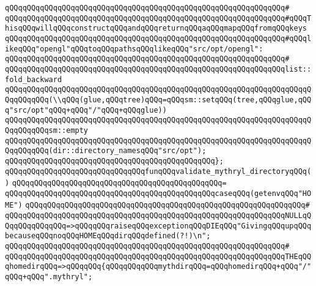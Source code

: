 \verb|qQQqqQQqqQQqqQQqqQQqqQQqqQQqqQQqqQQqqQQqqQQqqQQqqQQqqQQqqQQqqQQq#|\newline
\newline
\verb|qQQqqQQqqQQqqQQqqQQqqQQqqQQqqQQqqQQqqQQqqQQqqQQqqQQqqQQqqQQqqQQq#qQQqThisqQQqwillqQQqconstructqQQqandqQQqreturnqQQqaqQQqmapqQQqfromqQQqkeys|\newline
\verb|qQQqqQQqqQQqqQQqqQQqqQQqqQQqqQQqqQQqqQQqqQQqqQQqqQQqqQQqqQQqqQQq#qQQqlikeqQQq"opengl"qQQqtoqQQqpathsqQQqlikeqQQq"src/opt/opengl":|\newline
\verb|qQQqqQQqqQQqqQQqqQQqqQQqqQQqqQQqqQQqqQQqqQQqqQQqqQQqqQQqqQQqqQQq#|\newline
\verb|qQQqqQQqqQQqqQQqqQQqqQQqqQQqqQQqqQQqqQQqqQQqqQQqqQQqqQQqqQQqqQQqlist::fold_backward|\newline
\verb|qQQqqQQqqQQqqQQqqQQqqQQqqQQqqQQqqQQqqQQqqQQqqQQqqQQqqQQqqQQqqQQqqQQqqQQqqQQqqQQq(\\qQQq(glue,qQQqtree)qQQq=qQQqsm::setqQQq(tree,qQQqglue,qQQq"src/opt"qQQq+qQQq"/"qQQq+qQQqglue))|\newline
\verb|qQQqqQQqqQQqqQQqqQQqqQQqqQQqqQQqqQQqqQQqqQQqqQQqqQQqqQQqqQQqqQQqqQQqqQQqqQQqqQQqsm::empty|\newline
\verb|qQQqqQQqqQQqqQQqqQQqqQQqqQQqqQQqqQQqqQQqqQQqqQQqqQQqqQQqqQQqqQQqqQQqqQQqqQQqqQQq(dir::directory_namesqQQq"src/opt");|\newline
\verb|qQQqqQQqqQQqqQQqqQQqqQQqqQQqqQQqqQQqqQQqqQQqqQQq};|\newline
\newline
\verb|qQQqqQQqqQQqqQQqqQQqqQQqqQQqqQQqfunqQQqvalidate_mythryl_directoryqQQq()|\newline
\verb|qQQqqQQqqQQqqQQqqQQqqQQqqQQqqQQqqQQqqQQqqQQqqQQq=|\newline
\verb|qQQqqQQqqQQqqQQqqQQqqQQqqQQqqQQqqQQqqQQqqQQqqQQqcaseqQQq(getenvqQQq"HOME")|\newline
\verb|qQQqqQQqqQQqqQQqqQQqqQQqqQQqqQQqqQQqqQQqqQQqqQQqqQQqqQQqqQQqqQQq#|\newline
\verb|qQQqqQQqqQQqqQQqqQQqqQQqqQQqqQQqqQQqqQQqqQQqqQQqqQQqqQQqqQQqqQQqNULLqQQqqQQqqQQqqQQq=>qQQqqQQqraiseqQQqexceptionqQQqDIEqQQq"GivingqQQqupqQQqbecauseqQQqnoqQQqHOMEqQQqdirqQQqdefined(?!)\n";|\newline
\verb|qQQqqQQqqQQqqQQqqQQqqQQqqQQqqQQqqQQqqQQqqQQqqQQqqQQqqQQqqQQqqQQq#|\newline
\verb|qQQqqQQqqQQqqQQqqQQqqQQqqQQqqQQqqQQqqQQqqQQqqQQqqQQqqQQqqQQqqQQqTHEqQQqhomedirqQQq=>qQQqqQQq{qQQqqQQqqQQqmythdirqQQq=qQQqhomedirqQQq+qQQq"/"qQQq+qQQq".mythryl";|\newline
